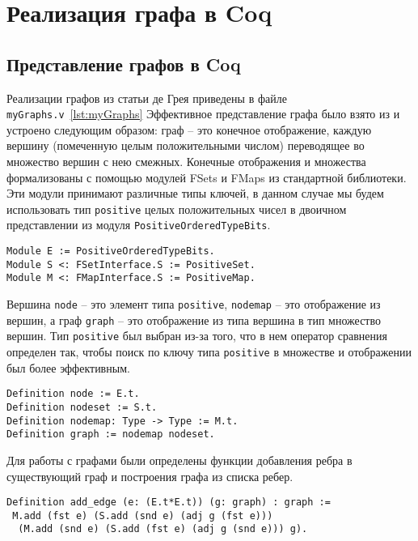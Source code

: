 

\chapter{Реализация графа в Coq}

\section{Представление графов в Coq}
Реализации графов из статьи де Грея приведены в файле {\tt myGraphs.v}~\ref{lst:myGraphs}
Эффективное представление графа было взято из\cite{VFA} и устроено
следующим образом: граф -- это конечное отображение, каждую вершину
(помеченную целым положительными числом) переводящее во
множество вершин с нею смежных. Конечные отображения и множества
формализованы с помощью модулей FSets и FMaps из стандартной
библиотеки. Эти модули принимают различные типы ключей, в данном случае мы будем использовать тип {\tt positive} целых положительных чисел в двоичном представлении из модуля {\tt PositiveOrderedTypeBits}.

\begin{verbatim}
Module E := PositiveOrderedTypeBits.
Module S <: FSetInterface.S := PositiveSet.
Module M <: FMapInterface.S := PositiveMap.
\end{verbatim} 

Вершина {\tt node} -- это элемент типа {\tt positive}, {\tt nodemap} -- это отображение из вершин, а граф {\tt graph} -- это отображение из типа вершина в тип множество вершин. Тип {\tt positive} был выбран из-за того, что в нем оператор сравнения определен так, чтобы поиск по ключу типа {\tt positive} в множестве и отображении был более эффективным.

\begin{verbatim}
Definition node := E.t.
Definition nodeset := S.t.
Definition nodemap: Type -> Type := M.t.
Definition graph := nodemap nodeset.
\end{verbatim}

Для работы с графами были определены функции добавления ребра в существующий граф и построения графа из списка ребер.

\begin{verbatim}
Definition add_edge (e: (E.t*E.t)) (g: graph) : graph :=
 M.add (fst e) (S.add (snd e) (adj g (fst e))) 
  (M.add (snd e) (S.add (fst e) (adj g (snd e))) g).
\end{verbatim}

